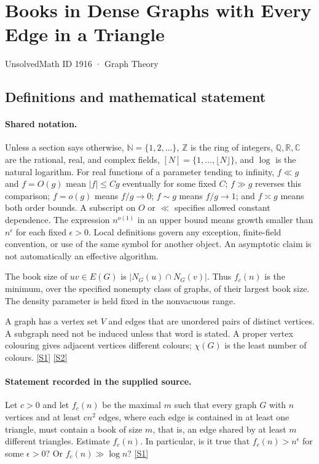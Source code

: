 \documentclass[11pt,a4paper]{article}
\newcommand{\N}{\mathbb{N}}
\newcommand{\Z}{\mathbb{Z}}
\newcommand{\Q}{\mathbb{Q}}
\newcommand{\R}{\mathbb{R}}
\newcommand{\C}{\mathbb{C}}
\newcommand{\sref}[2]{\hyperlink{source:#1:#2}{[S#2]}}
\begin{document}

\setcounter{section}{1915}

\section{Books in Dense Graphs with Every Edge in a Triangle}\label{1916}

{\small\sffamily UnsolvedMath ID 1916 · Graph Theory}

\subsection{Definitions and mathematical statement}

\paragraph{Shared notation.}Unless a section says otherwise, $\N=\{1,2,\ldots\}$,
$\Z$ is the ring of integers, $\Q,\R,\C$ are the rational, real, and complex
fields, $[N]=\{1,\ldots,\lfloor N\rfloor\}$, and $\log$ is the natural
logarithm. For real functions of a parameter tending to infinity,
$f\ll g$ and $f=O(g)$ mean $|f|\leq Cg$ eventually for some fixed $C$;
$f\gg g$ reverses this comparison; $f=o(g)$ means $f/g\to0$;
$f\sim g$ means $f/g\to1$; and $f\asymp g$ means both order bounds.
A subscript on $O$ or $\ll$ specifies allowed constant dependence.
The expression $n^{o(1)}$ in an upper bound means growth smaller than
$n^\epsilon$ for each fixed $\epsilon>0$. Local definitions govern any
exception, finite-field convention, or use of the same symbol for another
object. An asymptotic claim is not automatically an effective algorithm.



The book size of $uv\in E(G)$ is $|N_G(u)\cap N_G(v)|$. Thus $f_c(n)$ is the minimum, over the specified nonempty class of graphs, of their largest book size. The density parameter is held fixed in the nonvacuous range.

A graph has a vertex set $V$ and edges that are unordered pairs of distinct vertices. A subgraph need not be induced unless that word is stated. A proper vertex colouring gives adjacent vertices different colours; $\chi(G)$ is the least number of colours. \sref{1916}{1} \sref{1916}{2}

\paragraph{Statement recorded in the supplied source.}
Let $c>0$ and let $f_c(n)$ be the maximal $m$ such that every graph $G$ with $n$ vertices and at least $cn^2$ edges, where each edge is contained in at least one triangle, must contain a book of size $m$, that is, an edge shared by at least $m$ different triangles.
Estimate $f_c(n)$. In particular, is it true that $f_c(n)>n^{\epsilon}$ for some $\epsilon>0$? Or $f_c(n)\gg \log n$? \sref{1916}{1}
\end{document}
